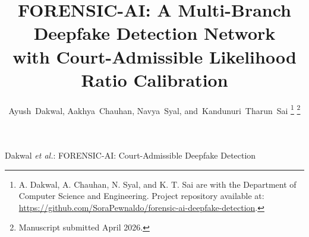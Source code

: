 \documentclass[journal]{IEEEtran}
\begin{document}
\title{FORENSIC-AI: A Multi-Branch Deepfake Detection Network\\
with Court-Admissible Likelihood Ratio Calibration}

\author{Ayush~Dakwal,
        Aakhya~Chauhan,
        Navya~Syal,
        and~Kandunuri~Tharun~Sai%
\thanks{A. Dakwal, A. Chauhan, N. Syal, and K. T. Sai are with the Department
of Computer Science and Engineering. Project repository available at:
\protect\url{https://github.com/SoraPewnaldo/forensic-ai-deepfake-detection}.}%
\thanks{Manuscript submitted April 2026.}}

%
{Dakwal \MakeLowercase{\textit{et al.}}: FORENSIC-AI: Court-Admissible Deepfake Detection}

\maketitle
\end{document}
